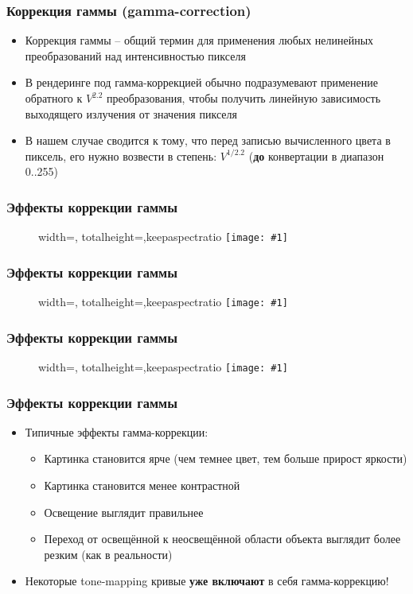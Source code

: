 \documentclass[10pt,handout]{beamer}
\newcommand{\slideimage}[1]{
  \begin{figure}
    \begin{adjustbox}{width=\textwidth, totalheight=\textheight-2\baselineskip-2\baselineskip,keepaspectratio}
      \texttt{[image: \#1]}
    \end{adjustbox}
  \end{figure}
}
\begin{document}
\begin{frame}[fragile]
\frametitle{Коррекция гаммы (gamma-correction)}
\begin{itemize}
\item Коррекция гаммы -- общий термин для применения любых нелинейных преобразований над интенсивностью пикселя
\pause
\item В рендеринге под гамма-коррекцией обычно подразумевают применение обратного к \begin{math}V^{2.2}\end{math} преобразования, чтобы получить линейную зависимость выходящего излучения от значения пикселя
\pause
\item В нашем случае сводится к тому, что перед записью вычисленного цвета в пиксель, его нужно возвести в степень: \begin{math}V^{1/2.2}\end{math} (\textbf{до} конвертации в диапазон 0..255)
\end{itemize}
\end{frame}

\begin{frame}[fragile]
\frametitle{Эффекты коррекции гаммы}
\slideimage{gamma-ex1.png}
\end{frame}

\begin{frame}[fragile]
\frametitle{Эффекты коррекции гаммы}
\slideimage{gamma-ex2.png}
\end{frame}

\begin{frame}[fragile]
\frametitle{Эффекты коррекции гаммы}
\slideimage{gamma-ex3.png}
\end{frame}

\begin{frame}[fragile]
\frametitle{Эффекты коррекции гаммы}
\begin{itemize}
\item Типичные эффекты гамма-коррекции:
\pause
\begin{itemize}
\item Картинка становится ярче (чем темнее цвет, тем больше прирост яркости)
\pause
\item Картинка становится менее контрастной
\pause
\item Освещение выглядит правильнее
\pause
\item Переход от освещённой к неосвещённой области объекта выглядит более резким (как в реальности)
\end{itemize}
\pause
\item Некоторые tone-mapping кривые \textbf{уже включают} в себя гамма-коррекцию!
\end{itemize}
\end{frame}
\end{document}
